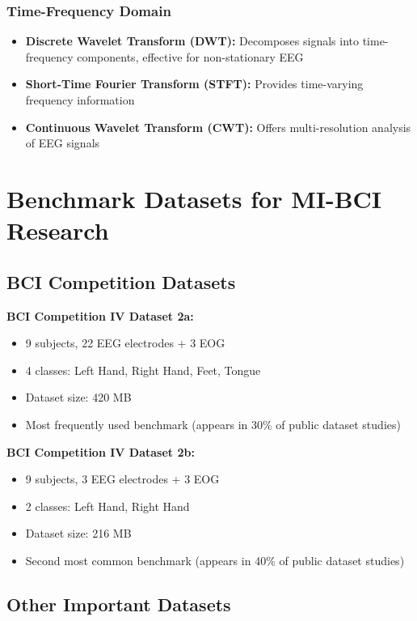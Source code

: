 \documentclass[12pt]{article}
\begin{document}
\subsubsection{Time-Frequency Domain}

\begin{itemize}
    \item \textbf{Discrete Wavelet Transform (DWT):} Decomposes signals into time-frequency components, effective for non-stationary EEG
    \item \textbf{Short-Time Fourier Transform (STFT):} Provides time-varying frequency information
    \item \textbf{Continuous Wavelet Transform (CWT):} Offers multi-resolution analysis of EEG signals
\end{itemize}

\section{Benchmark Datasets for MI-BCI Research}

\subsection{BCI Competition Datasets}

\textbf{BCI Competition IV Dataset 2a:}
\begin{itemize}
    \item 9 subjects, 22 EEG electrodes + 3 EOG
    \item 4 classes: Left Hand, Right Hand, Feet, Tongue
    \item Dataset size: 420 MB
    \item Most frequently used benchmark (appears in 30\% of public dataset studies)
\end{itemize}

\textbf{BCI Competition IV Dataset 2b:}
\begin{itemize}
    \item 9 subjects, 3 EEG electrodes + 3 EOG
    \item 2 classes: Left Hand, Right Hand
    \item Dataset size: 216 MB
    \item Second most common benchmark (appears in 40\% of public dataset studies)
\end{itemize}

\subsection{Other Important Datasets}
\end{document}

